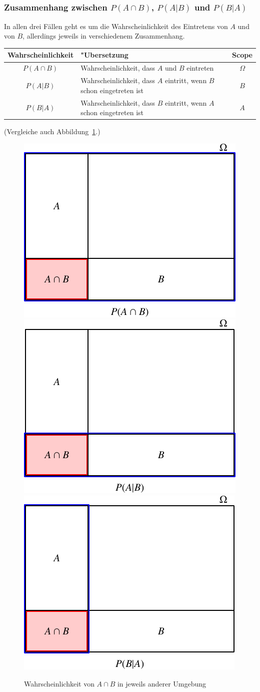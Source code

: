 \subsubsection{Zusammenhang zwischen \texorpdfstring{$P(A\cap B)$}{P(A geschnitten B)}, \texorpdfstring{$P(A|B)$}{P(A bedingt B)} und \texorpdfstring{$P(B|A)$}{P(B bedingt A)}}
In allen drei Fällen geht es um die Wahrscheinlichkeit des Eintretens
von $A$ und von $B$, allerdings jeweils in verschiedenem
Zusammenhang.
\begin{center}
\begin{tabular}{|c|l|c|}
\hline
Wahrscheinlichkeit&"Ubersetzung&Scope\\
\hline
$P(A\cap B)$&\strut Wahrscheinlichkeit, dass $A$ und $B$ eintreten\strut &$\Omega$\\
$P(A|B)$&\begin{minipage}[t]{3.0in}\strut Wahrscheinlichkeit, dass $A$ eintritt, wenn $B$ schon eingetreten ist\strut \end{minipage}&$B$\\
$P(B|A)$&\begin{minipage}[t]{3.0in}\strut Wahrscheinlichkeit, dass $B$ eintritt, wenn $A$ schon eingetreten ist\strut \end{minipage}&$A$\\
\hline
\end{tabular}
\end{center}
(Vergleiche auch Abbildung~\ref{condprob}.)
\begin{figure}
\begin{center}
\includegraphics[width=0.3\hsize]{images/abhaengigkeit-3}\quad
\includegraphics[width=0.3\hsize]{images/abhaengigkeit-5}\quad
\includegraphics[width=0.3\hsize]{images/abhaengigkeit-4}
\end{center}
\caption{Wahrscheinlichkeit von $A\cap B$ in jeweils anderer Umgebung
\label{condprob}}
\end{figure}


